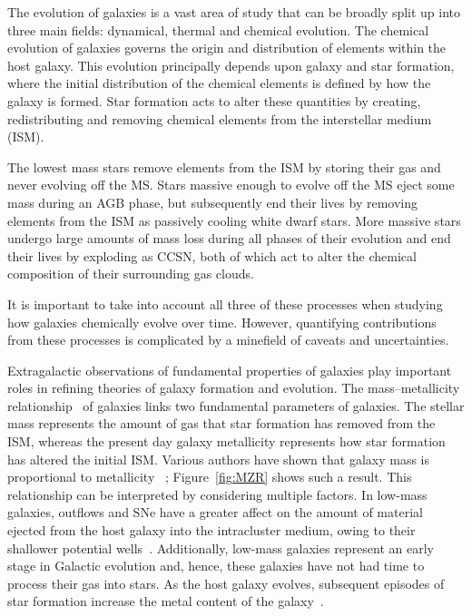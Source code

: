 The evolution of galaxies is a vast area of study that can be broadly split up into three main fields: dynamical, thermal and chemical evolution.
The chemical evolution of galaxies governs the origin and distribution of elements within the host galaxy.
This evolution principally depends upon galaxy and star formation, where
the initial distribution of the chemical elements is defined by how the galaxy is formed.
Star formation acts to alter these quantities by creating, redistributing and removing chemical elements from the interstellar medium (ISM).

The lowest mass stars remove elements from the ISM by storing their gas and never evolving off the MS.
Stars massive enough to evolve off the MS eject some mass during an AGB phase, but subsequently end their lives by removing elements from the ISM as passively cooling white dwarf stars.
More massive stars undergo large amounts of mass loss during all phases of their evolution and end their lives by exploding as CCSN, both of which act to alter the chemical composition of their surrounding gas clouds.

It is important to take into account all three of these processes when studying how galaxies chemically evolve over time.
However, quantifying contributions from these processes is complicated by a minefield of caveats and uncertainties.

Extragalactic observations of fundamental properties of galaxies play important roles in refining theories of galaxy formation and evolution.
The mass--metallicity relationship~\citep[MZR;][]{Lequeux79} of galaxies links two fundamental parameters of galaxies.
The stellar mass represents the amount of gas that star formation has removed from the ISM, whereas the present day galaxy metallicity represents how star formation has altered the initial ISM.
Various authors have shown that galaxy mass is proportional to metallicity
~\citep{Tremonti04,Kewley08,Maiolino08}; Figure~\ref{fig:MZR} shows such a result.
This relationship can be interpreted by considering multiple factors.
In low-mass galaxies, outflows and SNe have a greater affect on the amount of material ejected from the host galaxy into the intracluster medium, owing to their shallower potential wells~\citep[e.g.][]{Tremonti04}.
Additionally, low-mass galaxies represent an early stage in Galactic evolution and, hence, these galaxies have not had time to process their gas into stars.
As the host galaxy evolves, subsequent episodes of star formation increase the metal content of the galaxy~\citep[e.g.][and references therein]{Maiolino08}.


